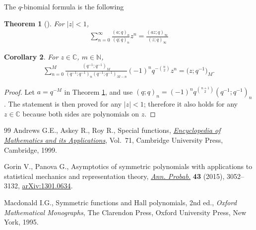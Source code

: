 \documentclass[11pt]{article}
\numberwithin{equation}{section}
\newtheorem{thm}{Theorem}[section]
\newtheorem{cor}[thm]{Corollary}
\newcommand{\C}{\mathbb{C}}
\newcommand{\N}{\mathbb{N}}
\begin{document}
The $q$-binomial formula is the following

\begin{thm}[{\cite[Theorem~10.2.1]{AAR}}]\label{qtheory2}
For $|z| < 1$,
\begin{gather*}
\sum_{n=0}^{\infty}{\frac{(a; q)_n}{(q; q)_n}z^n} = \frac{(az; q)_{\infty}}{(z; q)_{\infty}}
\end{gather*}
\end{thm}

\begin{cor}\label{qtheory25}
For $z\in\C$, $m\in\N$,
\begin{gather*}
\sum_{n=0}^M{\frac{(q^{-1}; q^{-1})_M}{(q^{-1}; q^{-1})_n(q^{-1}; q^{-1})_{M-n}}(-1)^nq^{-{n \choose 2}}z^n} = \big(z; q^{-1}\big)_M.
\end{gather*}
\end{cor}
\begin{proof}
Let $a = q^{-M}$ in Theorem \ref{qtheory2}, and use $(q; q)_n = (-1)^n q^{{n + 1 \choose 2}} (q^{-1}; q^{-1})_n$. The statement is then proved for any $|z| < 1$; therefore it also holds for any $z\in\C$ because both sides are polynomials on $z$.
\end{proof}
\begin{thebibliography}{99}
Andrews G.E., Askey R., Roy R., Special functions, \href{https://doi.org/10.1017/CBO9781107325937}{\textit{Encyclopedia of
 Mathematics and its Applications}}, Vol.~71, Cambridge University Press,
 Cambridge, 1999.

Gorin V., Panova G., Asymptotics of symmetric polynomials with applications to
 statistical mechanics and representation theory, \href{https://doi.org/10.1214/14-AOP955}{\textit{Ann. Probab.}}
 \textbf{43} (2015), 3052--3132, \href{https://arxiv.org/abs/1301.0634}{arXiv:1301.0634}.

Macdonald I.G., Symmetric functions and {H}all polynomials, 2nd ed., \textit{Oxford
 Mathematical Monographs}, The Clarendon Press, Oxford University Press, New
 York, 1995.

\end{thebibliography}
\end{document}
